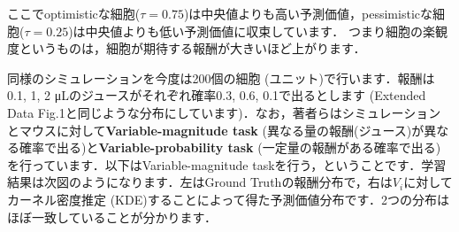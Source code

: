 ここでoptimisticな細胞($\tau=0.75$)は中央値よりも高い予測価値，pessimisticな細胞($\tau=0.25$)は中央値よりも低い予測価値に収束しています． つまり細胞の楽観度というものは，細胞が期待する報酬が大きいほど上がります．

同様のシミュレーションを今度は200個の細胞 (ユニット)で行います．報酬は0.1, 1, 2 μLのジュースがそれぞれ確率0.3, 0.6, 0.1で出るとします (Extended Data Fig.1と同じような分布にしています)．なお，著者らはシミュレーションとマウスに対して\textbf{Variable-magnitude task}
(異なる量の報酬(ジュース)が異なる確率で出る)と\textbf{Variable-probability task} (一定量の報酬がある確率で出る)を行っています．以下はVariable-magnitude taskを行う，ということです．学習結果は次図のようになります．左はGround Truthの報酬分布で，右は$V_i$に対してカーネル密度推定
(KDE)することによって得た予測価値分布です．2つの分布はほぼ一致していることが分かります．
